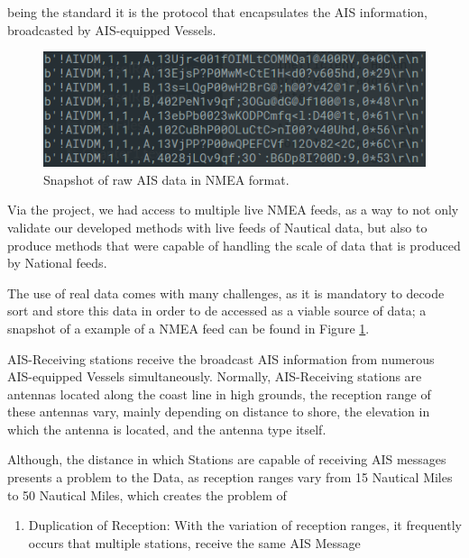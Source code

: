 being the standard it is the protocol that encapsulates the AIS information, broadcasted by AIS-equipped Vessels. 

\begin{figure}[H]
	\centering
	\includegraphics[scale = .5]{figures/Ch3/NMEAexample.png}
    \caption{Snapshot of raw AIS data in NMEA format.}
    \label{fig:NMEAexample}
\end{figure}


Via the project, we had access to multiple live NMEA feeds, as a way to not only validate our developed methods with live feeds of Nautical data, but also to produce methods that were capable of handling the scale of data that is produced by National feeds.

The use of real data comes with many challenges, as it is mandatory to decode sort and store this data in order to de accessed as a viable source of data; a snapshot of a example of a NMEA feed can be found in Figure \ref{fig:NMEAexample}. 


AIS-Receiving stations receive the broadcast AIS information from numerous AIS-equipped Vessels simultaneously. Normally, AIS-Receiving stations are antennas located along the coast line in high grounds, the reception range of these antennas vary, mainly depending on distance to shore, the elevation in which the antenna is located, and the antenna type itself.

Although, the distance in which Stations are capable of receiving AIS messages presents a problem to the Data, as reception ranges vary from 15 Nautical Miles to 50 Nautical Miles, which creates the problem of 

\begin{enumerate}
\item Duplication of Reception:  With the variation of reception ranges, it frequently occurs that multiple stations, receive the same AIS Message


\end{enumerate}

